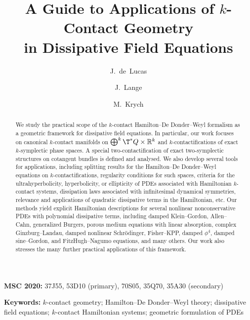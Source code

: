 \documentclass[11pt,a4paper]{article}
\title{\bf A Guide to Applications of $k$-Contact Geometry\\
in Dissipative Field Equations}
\author{J.~de~Lucas}
\author{J.~Lange}
\author{M.~Krych}
\affil{\small Department of Mathematical Methods in Physics, Faculty of Physics,
University of Warsaw, ul.~Pasteura~5, 02--093 Warsaw, Poland}
\date{}
\theoremstyle{plain} \newtheorem{theorem}{Theorem}[section] \newtheorem{proposition}[theorem]{Proposition} \newtheorem{corollary}[theorem]{Corollary} \newtheorem{lemma}[theorem]{Lemma} \theoremstyle{definition} \newtheorem{definition}[theorem]{Definition} \theoremstyle{remark} \newtheorem{remark}[theorem]{Remark} \newtheorem{example}[theorem]{Example} %
\newcommand{\subjclass}[2][]{%
\noindent\textbf{MSC 2020:} #2\par
}
\newcommand{\keywords}[1]{%
\noindent\textbf{Keywords:} #1\par
}
\begin{document}
 
 

 
\maketitle



\begin{abstract}


We study the practical scope of the $k$-contact Hamilton--De Donder--Weyl formalism as a geometric framework for dissipative field equations. In particular, our work focuses on canonical $k$-contact manifolds on $\bigoplus^k \T^*Q\times\mathbb R^k$ and  $k$-contactifications of exact $k$-symplectic phase spaces. A special two-contactification of exact two-symplectic structures on cotangent bundles is defined and analysed.  We also develop several tools for applications, including splitting results for the Hamilton--De Donder--Weyl equations on $k$-contactifications, regularity conditions for such spaces, criteria for the ultrahyperbolicity, hyperbolicity, or ellipticity of PDEs associated with Hamiltonian $k$-contact systems,  dissipation laws associated with infinitesimal dynamical symmetries, relevance and applications of quadratic dissipative terms in the Hamiltonian, etc. Our methods yield explicit Hamiltonian descriptions for several nonlinear nonconservative PDEs with polynomial  dissipative terms, including damped Klein--Gordon, Allen--Cahn, generalized Burgers,   porous medium equations with linear absorption, complex Ginzburg--Landau, damped nonlinear Schr\"odinger, Fisher--KPP, damped $\phi^4$, damped sine--Gordon, and FitzHugh--Nagumo equations, and many others. Our work also stresses the many further practical applications of this framework. 
\end{abstract}
 

\subjclass[2020]{37J55, 53D10 (primary), 70S05, 35Q70, 35A30 (secondary)}



\keywords{$k$-contact geometry; Hamilton--De Donder--Weyl theory;
dissipative field equations; $k$-contact Hamiltonian systems;
geometric formulation of PDEs}
\end{document}
